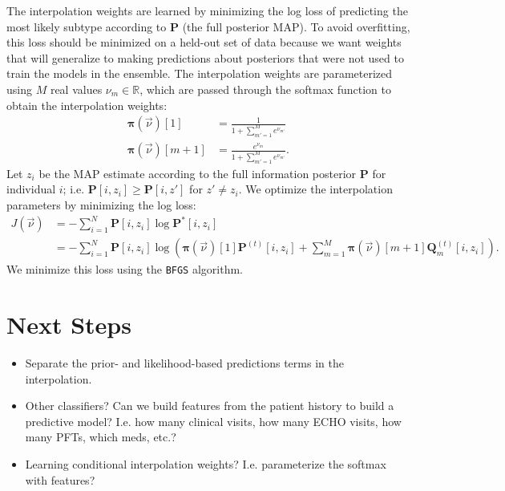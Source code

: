 \documentclass[12pt]{article}
\newcommand{\R}{\mathbb{R}}
\newcommand{\psup}[1]{^{(#1)}}
\begin{document}
The interpolation weights are learned by minimizing the log loss of predicting the most likely subtype according to $\bm{P}$ (the full posterior MAP). To avoid overfitting, this loss should be minimized on a held-out set of data because we want weights that will generalize to making predictions about posteriors that were not used to train the models in the ensemble. The interpolation weights are parameterized using $M$ real values $\nu_m \in \R$, which are passed through the softmax function to obtain the interpolation weights:
\begin{align}
\bm{\pi}(\vec{\nu})[1] &= \frac{1}{1 + \sum_{m'=1}^M e^{\nu_{m'}}} \\
\bm{\pi}(\vec{\nu})[m + 1] &= \frac{e^{\nu_m}}{1 + \sum_{m' = 1}^M e^{\nu_{m'}}}.
\end{align}
Let $z_i$ be the MAP estimate according to the full information posterior $\bm{P}$ for individual $i$; i.e. $\bm{P}[i, z_i] \ge \bm{P}[i, z']$ for $z' \neq z_i$. We optimize the interpolation parameters by minimizing the log loss:
\begin{align}
J(\vec{\nu}) &= - \sum_{i=1}^N \bm{P}[i, z_i] \log \bm{P}^*[i, z_i] \\
             \nonumber
             &= - \sum_{i=1}^N \bm{P}[i, z_i] \log \left( \bm{\pi}(\vec{\nu})[1] \bm{P}\psup{t}[i, z_i] + \sum_{m=1}^M \bm{\pi}(\vec{\nu})[m + 1] \bm{Q}_m\psup{t}[i, z_i] \right).
\end{align}
We minimize this loss using the \texttt{BFGS} algorithm.

\section{Next Steps}

\begin{itemize}
\item Separate the prior- and likelihood-based predictions terms in the interpolation.
\item Other classifiers? Can we build features from the patient history to build a predictive model? I.e. how many clinical visits, how many ECHO visits, how many PFTs, which meds, etc.?
\item Learning conditional interpolation weights? I.e. parameterize the softmax with features?
\end{itemize}
\end{document}
